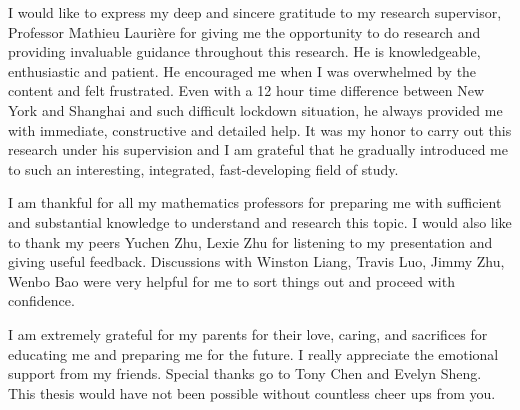 I would like to express my deep and sincere gratitude to my research supervisor, Professor Mathieu Laurière for giving me the opportunity to do research and providing invaluable guidance throughout this research. He is knowledgeable, enthusiastic and patient. He encouraged me when I was overwhelmed by the content and felt frustrated. Even with a 12 hour time difference between New York and Shanghai and such difficult lockdown situation, he always provided me with immediate, constructive and detailed help. It was my honor to carry out this research under his supervision and I am grateful that he gradually introduced me to such an interesting, integrated, fast-developing field of study.

\noindent I am thankful for all my mathematics professors for preparing me with sufficient and substantial knowledge to understand and research this topic. I would also like to thank my peers Yuchen Zhu, Lexie Zhu for listening to my presentation and giving useful feedback. Discussions with Winston Liang, Travis Luo, Jimmy Zhu, Wenbo Bao were very helpful for me to sort things out and proceed with confidence. 

\noindent I am extremely grateful for my parents for their love, caring, and sacrifices for educating me and preparing me for the future. I really appreciate the emotional support from my friends. Special thanks go to Tony Chen and Evelyn Sheng. This thesis would have not been possible without countless cheer ups from you.